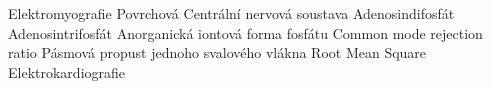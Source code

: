            {Elektromyografie}
          {Povrchová }
           {Centrální nervová soustava}
           {Adenosindifosfát}
           {Adenosintrifosfát}
  {Anorganická iontová forma fosfátu}
          {Common mode rejection ratio}
            {Pásmová propust}
         { jednoho svalového vlákna}
           {Root Mean Square}
           {Elektrokardiografie}
